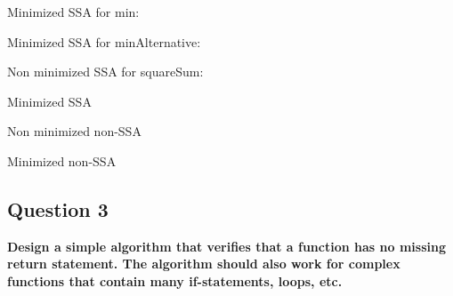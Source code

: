    Minimized SSA for min:
    
    Minimized SSA for minAlternative:
    
    Non minimized SSA for squareSum:
    
    Minimized SSA
    
    Non minimized non-SSA
    
    Minimized non-SSA
    

\subsection{Question 3}
    \textbf{Design a simple algorithm that verifies that a function has no missing return statement. The algorithm should also work for complex functions that contain many if-statements, loops, etc.}

    

